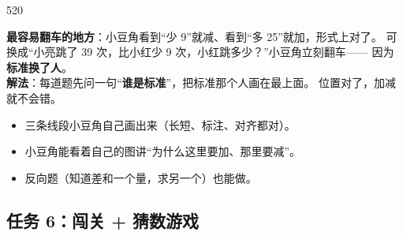 \begin{lesson}{5}{20}
\begin{pitbox}
\textbf{最容易翻车的地方}：小豆角看到“少 9”就减、看到“多 25”就加，形式上对了。
可换成“小亮跳了 39 次，比小红少 9 次，小红跳多少？”小豆角立刻翻车——
因为\textbf{标准换了人}。\\
\textbf{解法}：每道题先问一句“\textbf{谁是标准}”，把标准那个人画在最上面。
位置对了，加减就不会错。
\end{pitbox}

\begin{passbox}
\begin{itemize}
  \item 三条线段小豆角自己画出来（长短、标注、对齐都对）。
  \item 小豆角能看着自己的图讲“为什么这里要加、那里要减”。
  \item 反向题（知道差和一个量，求另一个）也能做。
\end{itemize}
\end{passbox}
\end{lesson}

\subsection{任务 6：闯关 + 猜数游戏}

